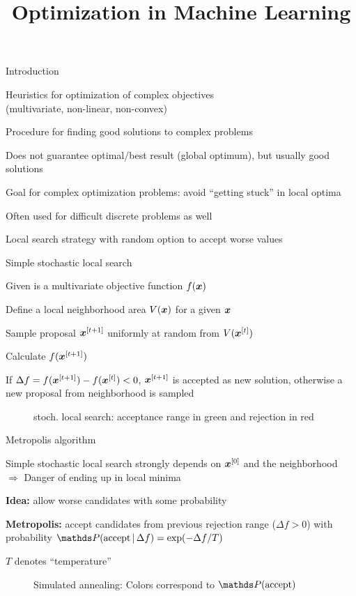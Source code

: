 \documentclass[11pt,compress,t,notes=noshow, xcolor=table]{beamer}
\title{Optimization in Machine Learning}
\begin{document}

\begin{framei}[fs=normalsize,sep=L]{Introduction}
\item Heuristics for optimization of complex objectives\\ (multivariate, non-linear, non-convex)
\item Procedure for finding good solutions to complex problems
\item Does not guarantee optimal/best result (global optimum), but usually good solutions
\item Goal for complex optimization problems: avoid \enquote{getting stuck} in local optima
\item Often used for difficult discrete problems as well
\item Local search strategy with random option to accept worse values
\end{framei}


\begin{framei}{Simple stochastic local search}
\item Given is a multivariate objective function $f(\bm{x})$
\item Define a local neighborhood area $V(\bm{x})$ for a given $\bm{x}$
\item Sample proposal $\bm{x}^{[t+1]}$ uniformly at random from $V(\bm{x}^{[t]})$
\item Calculate $f(\bm{x}^{[t+1]})$
\item If $\Delta f = f(\bm{x}^{[t+1]}) - f(\bm{x}^{[t]}) < 0$, $\bm{x}^{[t+1]}$ is accepted as new solution, otherwise a new proposal from neighborhood is sampled
\begin{figure}
\caption*{stoch. local search: acceptance range in green and rejection in red}
\end{figure}
\end{framei}


\begin{framei}{Metropolis algorithm}
\item Simple stochastic local search strongly depends on $\bm{x}^{[0]}$ and the neighborhood \\
$\Rightarrow$ Danger of ending up in local minima
\item \textbf{Idea:} allow worse candidates with some probability
\item \textbf{Metropolis:} accept candidates from previous rejection range ($\Delta f > 0$) with probability $\P(\text{accept} \,|\, \Delta f) = \exp(-\Delta f / T)$
\item $T$ denotes \enquote{temperature}
\begin{figure}
\caption*{
\footnotesize
Simulated annealing: Colors correspond to $\P(\text{accept})$}
\end{figure}
\end{framei}
\end{document}
